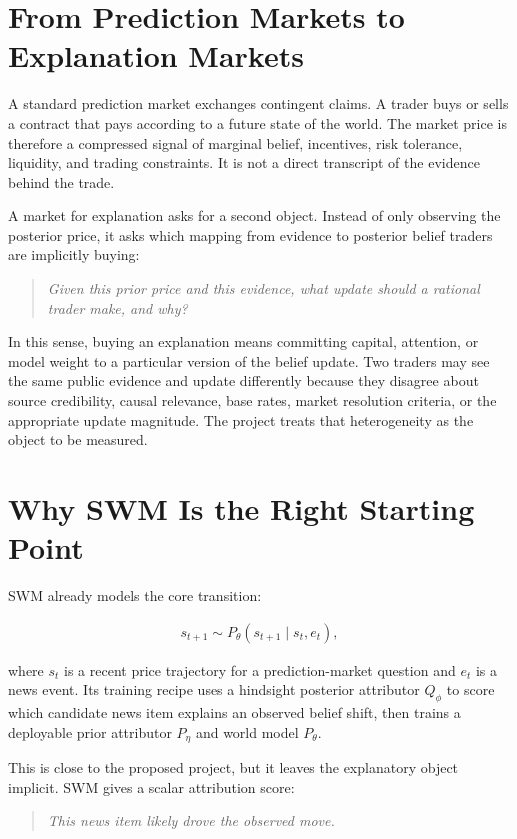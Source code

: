 \documentclass[11pt]{article}
\begin{document}
\section{From Prediction Markets to Explanation Markets}
A standard prediction market exchanges contingent claims. A trader buys or sells a contract that pays according to a future state of the world. The market price is therefore a compressed signal of marginal belief, incentives, risk tolerance, liquidity, and trading constraints. It is not a direct transcript of the evidence behind the trade.

A market for explanation asks for a second object. Instead of only observing the posterior price, it asks which mapping from evidence to posterior belief traders are implicitly buying:

\begin{quote}
\textit{Given this prior price and this evidence, what update should a rational trader make, and why?}
\end{quote}

In this sense, buying an explanation means committing capital, attention, or model weight to a particular version of the belief update. Two traders may see the same public evidence and update differently because they disagree about source credibility, causal relevance, base rates, market resolution criteria, or the appropriate update magnitude. The project treats that heterogeneity as the object to be measured.

\section{Why SWM Is the Right Starting Point}
SWM already models the core transition:

\begin{align}
s_{t+1} \sim P_\theta(s_{t+1}\mid s_t,e_t),
\end{align}

where $s_t$ is a recent price trajectory for a prediction-market question and $e_t$ is a news event. Its training recipe uses a hindsight posterior attributor $Q_\phi$ to score which candidate news item explains an observed belief shift, then trains a deployable prior attributor $P_\eta$ and world model $P_\theta$.

This is close to the proposed project, but it leaves the explanatory object implicit. SWM gives a scalar attribution score:

\begin{quote}
\textit{This news item likely drove the observed move.}
\end{quote}
\end{document}
